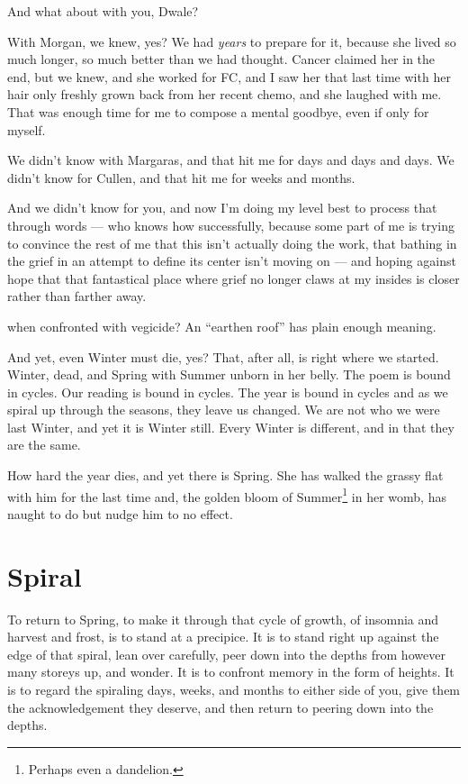 \documentclass[12pt,oneside]{memoir}
\begin{document}
{And what about with you, Dwale?\par
With Morgan, we knew, yes? We had \emph{years} to prepare for it, because she lived so much longer, so much better than we had thought. Cancer claimed her in the end, but we knew, and she worked for FC, and I saw her that last time with her hair only freshly grown back from her recent chemo, and she laughed with me. That was enough time for me to compose a mental goodbye, even if only for myself.\par
We didn't know with Margaras, and that hit me for days and days and days. We didn't know for Cullen, and that hit me for weeks and months.\par
And we didn't know for you, and now I'm doing my level best to process that through words --- who knows how successfully, because some part of me is trying to convince the rest of me that this isn't actually doing the work, that bathing in the grief in an attempt to define its center isn't moving on --- and hoping against hope that that fantastical place where grief no longer claws at my insides is closer rather than farther away.} when confronted with vegicide? An ``earthen roof'' has plain enough meaning.

And yet, even Winter must die, yes? That, after all, is right where we started. Winter, dead, and Spring with Summer unborn in her belly. The poem is bound in cycles. Our reading is bound in cycles. The year is bound in cycles and as we spiral up through the seasons, they leave us changed. We are not who we were last Winter, and yet it is Winter still. Every Winter is different, and in that they are the same.

How hard the year dies, and yet there is Spring. She has walked the grassy flat with him for the last time and, the golden bloom of Summer\footnote{Perhaps even a dandelion.} in her womb, has naught to do but nudge him to no effect.


\clearpage

\section*{Spiral}

To return to Spring, to make it through that cycle of growth, of insomnia and harvest and frost, is to stand at a precipice. It is to stand right up against the edge of that spiral, lean over carefully, peer down into the depths from however many storeys up, and wonder. It is to confront memory in the form of heights. It is to regard the spiraling days, weeks, and months to either side of you, give them the acknowledgement they deserve, and then return to peering down into the depths.
\end{document}

